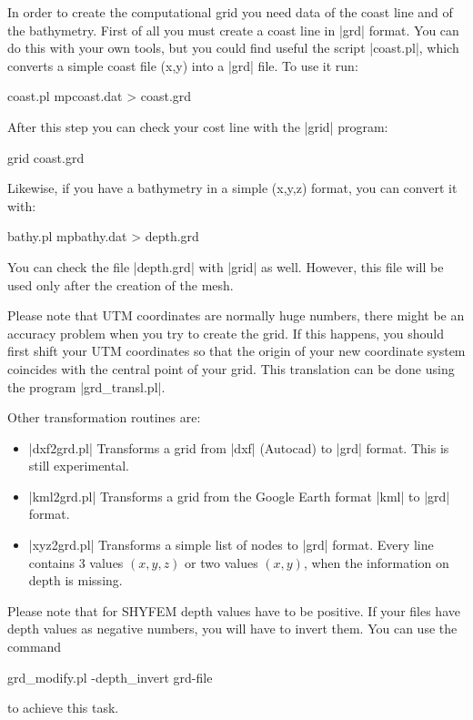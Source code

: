 
In order to create the computational grid you need data of the coast line
and of the bathymetry.
First of all you must create a coast line in |grd| format. You can do
this with your own tools, but you could find useful the script
|coast.pl|, which converts a simple coast file (x,y) into a |grd| file.
To use it run:

\begin{code}
    coast.pl mpcoast.dat > coast.grd
\end{code}

After this step you can check your cost line with the |grid| program:

\begin{code}
    grid coast.grd
\end{code}

Likewise, if you have a bathymetry in a simple (x,y,z) format, you can
convert it with:

\begin{code}
    bathy.pl mpbathy.dat > depth.grd
\end{code}

You can check the file |depth.grd| with |grid| as well. However, this file 
will be used only after the creation of the mesh.

Please note that UTM coordinates are normally huge numbers, there
might be an accuracy problem when you try to create the grid. If this
happens, you should first shift your UTM coordinates so that the origin
of your new coordinate system coincides with the central point of your
grid. This translation can be done using the program |grd_transl.pl|.

Other transformation routines are:

\begin{itemize}

\item |dxf2grd.pl|  Transforms a grid from |dxf| (Autocad) to |grd|
format. This is still experimental.

\item |kml2grd.pl|  Transforms a grid from the Google Earth format |kml|
to |grd| format.

\item |xyz2grd.pl|  Transforms a simple list of nodes to |grd|
format. Every line contains 3 values $(x,y,z)$ or two values $(x,y)$,
when the information on depth is missing.

\end{itemize}

Please note that for SHYFEM depth values have to be positive. If your
files have depth values as negative numbers, you will have to invert
them. You can use the command

\begin{code}
    grd_modify.pl -depth_invert grd-file
\end{code}

to achieve this task.

